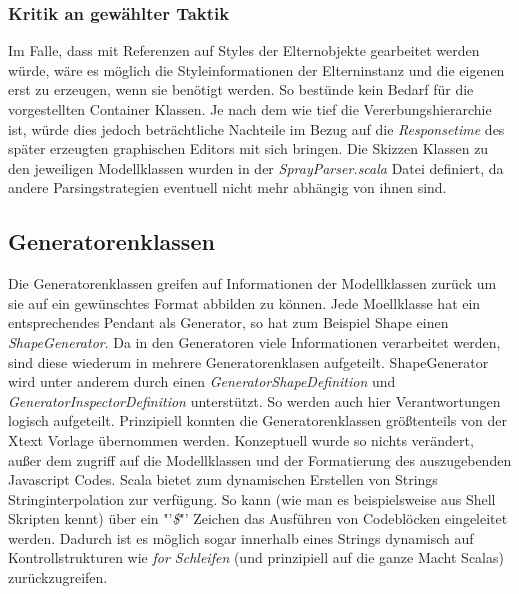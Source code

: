 \subsubsection{Kritik an gewählter Taktik}Im Falle, dass mit Referenzen auf Styles der Elternobjekte gearbeitet werden würde, wäre es möglich die Styleinformationen der Elterninstanz und die eigenen erst zu erzeugen, wenn sie benötigt werden. So bestünde kein Bedarf für die vorgestellten Container Klassen. Je nach dem wie tief die Vererbungshierarchie ist, würde dies jedoch beträchtliche Nachteile im Bezug auf die \textit{Responsetime} des später erzeugten graphischen Editors mit sich bringen. Die Skizzen Klassen zu den jeweiligen Modellklassen wurden in der \textit{SprayParser.scala} Datei definiert, da andere Parsingstrategien eventuell nicht mehr abhängig von ihnen sind.
\subsection{Generatorenklassen}
Die Generatorenklassen greifen auf Informationen der Modellklassen zurück um sie auf ein gewünschtes Format abbilden zu können. Jede Moellklasse hat ein entsprechendes Pendant als Generator, so hat zum Beispiel Shape einen \textit{ShapeGenerator}. Da in den Generatoren viele Informationen verarbeitet werden, sind diese wiederum in mehrere Generatorenklasen aufgeteilt. ShapeGenerator wird unter anderem durch einen \textit{GeneratorShapeDefinition} und \textit{GeneratorInspectorDefinition} unterstützt. So werden auch hier Verantwortungen logisch aufgeteilt. Prinzipiell konnten die Generatorenklassen größtenteils von der Xtext Vorlage übernommen werden. Konzeptuell wurde so nichts verändert, außer dem zugriff auf die Modellklassen und der Formatierung des auszugebenden Javascript Codes. Scala bietet zum dynamischen Erstellen von Strings Stringinterpolation zur verfügung. So kann (wie man es beispielsweise aus Shell Skripten kennt) über ein "'\textit{\$}"' Zeichen das Ausführen von Codeblöcken eingeleitet werden. Dadurch ist es möglich sogar innerhalb eines Strings dynamisch auf Kontrollstrukturen wie \textit{for Schleifen} (und prinzipiell auf die ganze Macht Scalas) zurückzugreifen.
